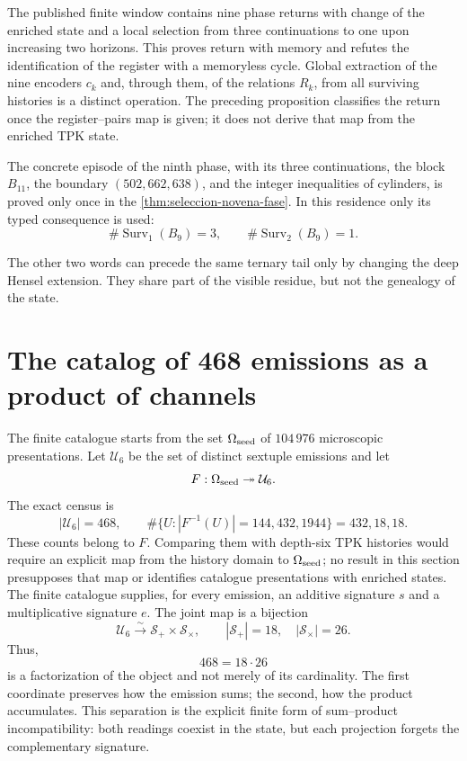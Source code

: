 The published finite window contains nine phase returns with change of the
enriched state and a local selection from three continuations to one upon
increasing two horizons. This proves return with memory and refutes the
identification of the register with a memoryless cycle. Global extraction of
the nine encoders \(c_k\) and, through them, of the relations
\(R_k\), from all surviving histories is a distinct operation.
The preceding proposition classifies the return once the
register--pairs map is given; it does not derive that map from the enriched TPK state.

The concrete episode of the ninth phase, with its three continuations, the
block \(B_{11}\), the boundary \((502,662,638)\), and the integer inequalities
of cylinders, is proved only once in the
\cref{thm:seleccion-novena-fase}. In this residence only its
typed consequence is used:
\[
\#\operatorname{Surv}_{1}(B_9)=3,\qquad
\#\operatorname{Surv}_{2}(B_9)=1.
\]

The other two words can precede the same ternary tail only by changing
the deep Hensel extension. They share part of the visible residue,
but not the genealogy of the state.

\section{The catalog of 468 emissions as a product of channels}

The finite catalogue starts from the set
\(\Omega_{\rm seed}\) of \(104\,976\) microscopic presentations. Let
\(\mathcal U_6\) be the set of distinct sextuple emissions and let
\[
 F:\Omega_{\rm seed}\twoheadrightarrow\mathcal U_6.
\]
The exact census is
\[
 |\mathcal U_6|=468,
 \qquad
 \#\{U:|F^{-1}(U)|=144,432,1944\}=432,18,18.
\]
These counts belong to \(F\). Comparing them with depth-six TPK
histories would require an explicit map from the history domain
to \(\Omega_{\rm seed}\); no result in this section presupposes that
map or identifies catalogue presentations with enriched states.
The finite catalogue supplies, for every emission, an additive signature
\(s\) and a multiplicative signature \(e\). The joint map is a
bijection
\[
 \mathcal U_6\xrightarrow{\sim}
 \mathcal S_+\times\mathcal S_\times,
 \qquad
 |\mathcal S_+|=18,
 \quad
 |\mathcal S_\times|=26.
\]
Thus,
\[
 \boxed{468=18\cdot26}
\]
is a factorization of the object and not merely of its cardinality. The first
coordinate preserves how the emission sums; the second, how the
product accumulates. This separation is the explicit finite form of
sum--product incompatibility: both readings coexist in the state, but
each projection forgets the complementary signature.


